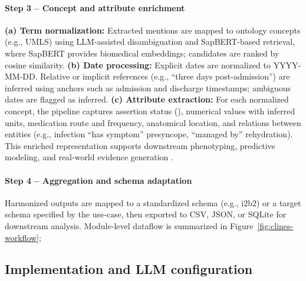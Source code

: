 \paragraph{Step 3 -- Concept and attribute enrichment} \textbf{(a) Term normalization:} Extracted mentions are mapped to ontology concepts (e.g., UMLS) using LLM-assisted disambiguation and SapBERT-based retrieval, where SapBERT \cite{liu2021self} provides biomedical embeddings; candidates are ranked by cosine similarity. \textbf{(b) Date processing:} Explicit dates are normalized to YYYY-MM-DD. Relative or implicit references (e.g., ``three days post-admission'') are inferred using anchors such as admission and discharge timestamps; ambiguous dates are flagged as inferred. \textbf{(c) Attribute extraction:} For each normalized concept, the pipeline captures assertion status (), numerical values with inferred units, medication route and frequency, anatomical location, and relations between entities (e.g., infection ``has symptom'' presyncope, ``managed by'' rehydration). This enriched representation supports downstream phenotyping, predictive modeling, and real-world evidence generation \cite{He_2023,Hou_2023}. 

\paragraph{Step 4 -- Aggregation and schema adaptation}  Harmonized outputs are mapped to a standardized schema (e.g., i2b2) or a target schema specified by the use-case, then exported to CSV, JSON, or SQLite for downstream analysis. Module-level dataflow is summarized in Figure~\ref{fig:clines-workflow}; 



\subsection{Implementation and LLM configuration}

